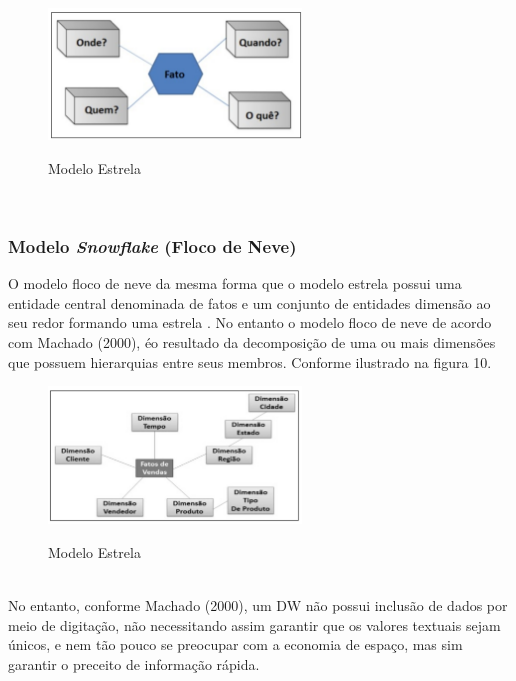 \begin{figure}[H]
	\vspace*{0,2cm}
    \centering
    \caption{Modelo Estrela}
    \includegraphics[width=0.6\textwidth]{./04-figuras/figura-09}
    \label{fig:ilustfig09}
\end{figure}
\vspace*{-0,9cm}
{\raggedright {}} \\

\subsubsection{Modelo \textit{Snowflake} (Floco de Neve)}

O modelo floco de neve da mesma forma que o modelo estrela possui uma entidade central denominada de fatos e um conjunto de entidades dimensão ao seu redor formando uma estrela
.
No entanto o modelo floco de neve de acordo com Machado (2000), \'{e}o resultado da decomposição de uma ou mais dimensões que possuem hierarquias entre seus membros. Conforme ilustrado na figura 10.
	
\begin{figure}[H]
	\vspace*{0,2cm}
    \centering
    \caption{Modelo Estrela}
    \includegraphics[width=0.6\textwidth]{./04-figuras/figura-10}
    \label{fig:ilustfig10}
\end{figure}
\vspace*{-0,9cm}
{\raggedright {}} \\

No entanto, conforme Machado (2000), um DW não possui inclusão de dados por meio de digitação, não necessitando assim garantir que os valores textuais sejam únicos, e nem tão pouco se preocupar com a economia de espaço, mas sim garantir o preceito de informação rápida.


